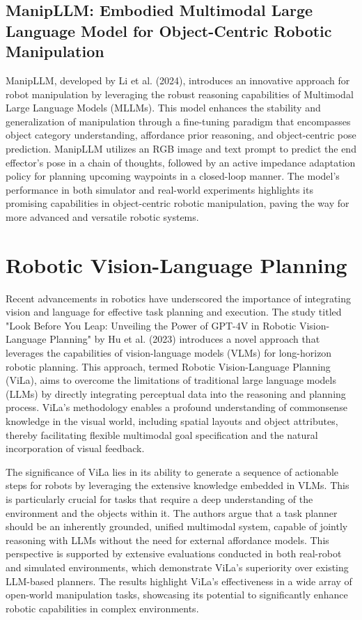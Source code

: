 \documentclass[a4paper]{article}
\begin{document}
\subsection{ManipLLM: Embodied Multimodal Large Language Model for Object-Centric Robotic Manipulation}
ManipLLM, developed by Li et al. (2024), introduces an innovative approach for robot manipulation by leveraging the robust reasoning capabilities of Multimodal Large Language Models (MLLMs). This model enhances the stability and generalization of manipulation through a fine-tuning paradigm that encompasses object category understanding, affordance prior reasoning, and object-centric pose prediction. ManipLLM utilizes an RGB image and text prompt to predict the end effector's pose in a chain of thoughts, followed by an active impedance adaptation policy for planning upcoming waypoints in a closed-loop manner. The model's performance in both simulator and real-world experiments highlights its promising capabilities in object-centric robotic manipulation, paving the way for more advanced and versatile robotic systems.
\section{Robotic Vision-Language Planning}
Recent advancements in robotics have underscored the importance of integrating vision and language for effective task planning and execution. The study titled "Look Before You Leap: Unveiling the Power of GPT-4V in Robotic Vision-Language Planning" by Hu et al. (2023) introduces a novel approach that leverages the capabilities of vision-language models (VLMs) for long-horizon robotic planning. This approach, termed Robotic Vision-Language Planning (ViLa), aims to overcome the limitations of traditional large language models (LLMs) by directly integrating perceptual data into the reasoning and planning process. ViLa's methodology enables a profound understanding of commonsense knowledge in the visual world, including spatial layouts and object attributes, thereby facilitating flexible multimodal goal specification and the natural incorporation of visual feedback.

The significance of ViLa lies in its ability to generate a sequence of actionable steps for robots by leveraging the extensive knowledge embedded in VLMs. This is particularly crucial for tasks that require a deep understanding of the environment and the objects within it. The authors argue that a task planner should be an inherently grounded, unified multimodal system, capable of jointly reasoning with LLMs without the need for external affordance models. This perspective is supported by extensive evaluations conducted in both real-robot and simulated environments, which demonstrate ViLa's superiority over existing LLM-based planners. The results highlight ViLa's effectiveness in a wide array of open-world manipulation tasks, showcasing its potential to significantly enhance robotic capabilities in complex environments.
\end{document}
